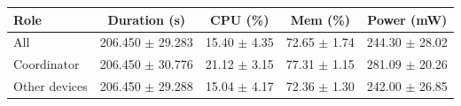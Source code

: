 \begin{tabular}{lcccc}
\hline
\textbf{Role} & \textbf{Duration (s)} & \textbf{CPU (\%)} & \textbf{Mem (\%)} & \textbf{Power (mW)} \\
\hline
All & 206.450 $\pm$ 29.283 & 15.40 $\pm$ 4.35 & 72.65 $\pm$ 1.74 & 244.30 $\pm$ 28.02 \\
Coordinator & 206.450 $\pm$ 30.776 & 21.12 $\pm$ 3.15 & 77.31 $\pm$ 1.15 & 281.09 $\pm$ 20.26 \\
Other devices & 206.450 $\pm$ 29.288 & 15.04 $\pm$ 4.17 & 72.36 $\pm$ 1.30 & 242.00 $\pm$ 26.85 \\
\hline
\end{tabular}
